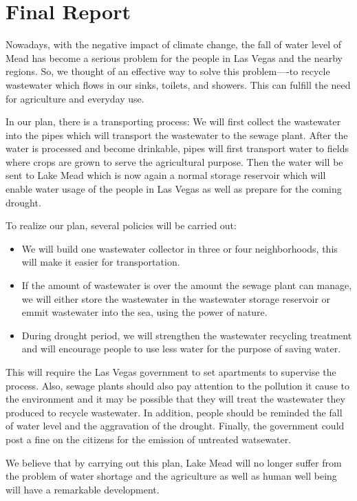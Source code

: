 \documentclass[12pt]{article}
\theoremstyle{definition}
\theoremstyle{remark}
\numberwithin{equation}{section}
\begin{document}
\newpage
\section{Final Report}
	Nowadays, with the negative impact of climate change, the fall of water level of Mead has become a serious problem for the people in Las Vegas and the nearby regions. So, we thought of an effective way to solve this problem----to recycle wastewater which flows in our sinks, toilets, and showers. This can fulfill the need for agriculture and everyday use.

	In our plan, there is a transporting process:
	We will first collect the wastewater into the pipes which will transport the wastewater to the sewage plant.
	After the water is processed and become drinkable, pipes will first transport water to fields where crops are grown to serve the agricultural purpose. 
	Then the water will be sent to Lake Mead which is now again a normal storage reservoir which will enable water usage of the people in Las Vegas as well as prepare for the coming drought.

	To realize our plan, several policies will be carried out:
	\begin{itemize}
		\item We will build one wastewater collector in three or four neighborhoods, this will make it easier for transportation.
		\item  If the amount of wastewater is over the amount the sewage plant can manage, we will either store the wastewater in the wastewater storage reservoir or emmit wastewater into the sea, using the power of nature.
		\item During drought period, we will strengthen the wastewater recycling treatment and will encourage people to use less water for the purpose of saving water.
	\end{itemize}

	This will require the Las Vegas government to set apartments to supervise the process. Also, sewage plants should also pay attention to the pollution it cause to the environment and it may be possible that they will treat the wastewater they produced to recycle wastewater. In addition, people should be reminded the fall of water level and the aggravation of the drought. Finally, the government could post a fine on the citizens for the emission of untreated watsewater.

	We believe that by carrying out this plan, Lake Mead will no longer suffer from the problem of water shortage and the agriculture as well as human well being will have a remarkable development.
\end{document}
